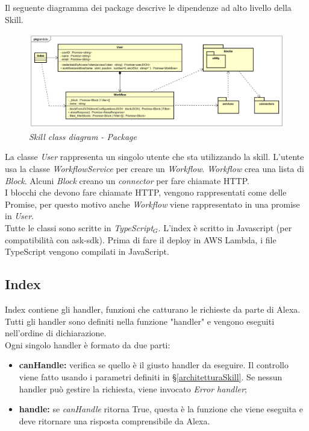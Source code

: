 Il seguente diagramma dei package descrive le dipendenze ad alto livello della Skill.\\
\begin{figure} [H]
    \centering
	\includegraphics[scale=0.35]{./images/ZeroSevenPackageLambda.png}
	\caption{\textit{Skill class diagram - Package}}\label{classlambda}
\end{figure}
\clearpage
La classe \textit{User} rappresenta un singolo utente che sta utilizzando la skill. L'utente usa la classe \textit{WorkflowService} per creare un \textit{Workflow}. \textit{Workflow} crea una lista di \textit{Block}. Alcuni \textit{Block} creano un \textit{connector} per fare chiamate HTTP.\\
I blocchi che devono fare chiamate HTTP, vengono rappresentati come delle Promise, per questo motivo anche \textit{Workflow} viene rappresentato in una promise in \textit{User}.\\
Tutte le classi sono scritte in \textit{TypeScript$_{G}$}. L'index è scritto in Javascript (per compatibilità con ask-sdk). Prima di fare il deploy in AWS Lambda, i file TypeScript vengono compilati in JavaScript.
\subsection{Index}
Index contiene gli handler, funzioni che catturano le richieste da parte di Alexa. Tutti gli handler sono definiti nella funzione "handler" e vengono eseguiti nell'ordine di dichiarazione.\\Ogni singolo handler è formato da due parti:
\begin{itemize}
    \item \textbf{canHandle:} verifica se quello è il giusto handler da eseguire. Il controllo viene fatto usando i parametri definiti in \S\ref{architetturaSkill}. Se nessun handler può gestire la richiesta, viene invocato \textit{Error handler};
    \item \textbf{handle:} se \textit{canHandle} ritorna True, questa è la funzione che viene eseguita e deve ritornare una risposta comprensibile da Alexa.
\end{itemize}
